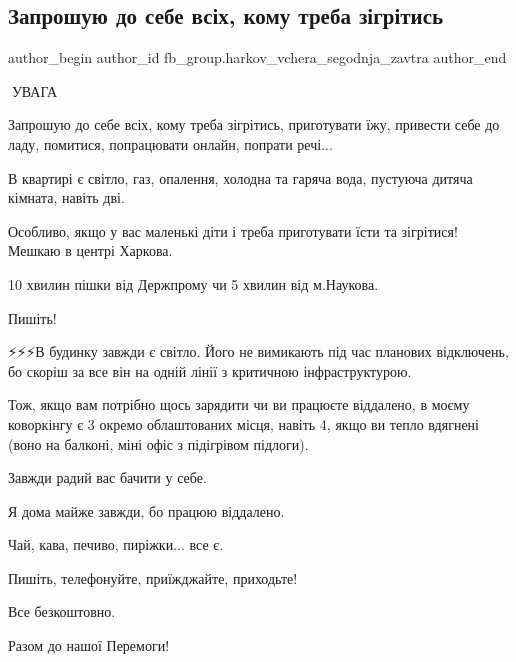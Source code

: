  
 
 
 
 
 
\subsection{Запрошую до себе всіх, кому треба зігрітись}
\label{sec:20_12_2022.fb.fb_group.harkov_vchera_segodnja_zavtra.1.zaproshuju}
 
\ifcmt
 author_begin
   author_id fb_group.harkov_vchera_segodnja_zavtra
 author_end
\fi

📢УВАГА 📢

Запрошую до себе всіх, кому треба зігрітись, приготувати їжу, привести себе до
ладу, помитися, попрацювати онлайн, попрати речі...

В квартирі є світло, газ, опалення, холодна та гаряча вода, пустуюча дитяча
кімната, навіть дві.

Особливо, якщо у вас маленькі діти і треба приготувати їсти та зігрітися!
Мешкаю в центрі Харкова.

10 хвилин пішки від Держпрому чи 5 хвилин від м.Наукова.

Пишіть!

⚡️⚡️⚡️В будинку завжди є світло. Його не вимикають під час планових відключень,
бо скоріш за все він на одній лінії з критичною інфраструктурою.

Тож, якщо вам потрібно щось зарядити чи ви працюєте віддалено, в моєму
коворкінгу є 3 окремо облаштованих місця, навіть 4, якщо ви тепло вдягнені
(воно на балконі, міні офіс з підігрівом підлоги).

Завжди радий вас бачити у себе.

Я дома майже завжди, бо працюю віддалено.

Чай, кава, печиво, пиріжки... все є.

Пишіть, телефонуйте, приїжджайте, приходьте!

Все безкоштовно.

Разом до нашої Перемоги!

